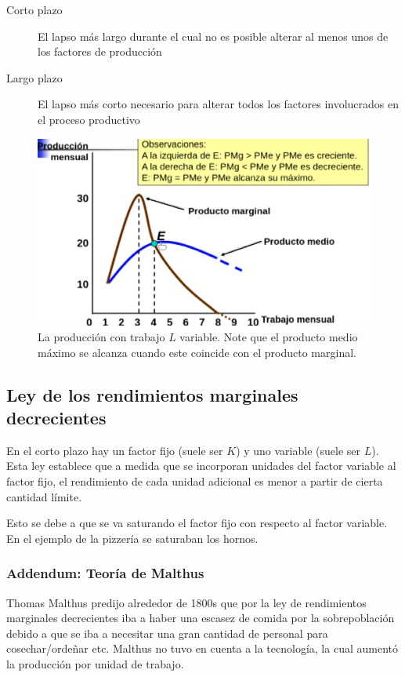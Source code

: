 \documentclass[twocolumn,10pt]{article}
\begin{document}
\begin{description}
	\item[Corto plazo] El lapso más largo durante el cual no es posible alterar al menos unos de los factores de producción
	\item[Largo plazo] El lapso más corto necesario para alterar todos los factores involucrados en el proceso productivo
\end{description}

\begin{figure}[tbh!]
	\centering
	\includegraphics[width=1\linewidth]{fig/funcionProduccionLvar}
	\caption{La producci\'on con trabajo $L$ variable. Note que el producto medio m\'aximo se alcanza cuando este coincide con el producto marginal.}
	\label{fig:funcionproduccionlvar}
\end{figure}



\subsection{Ley de los rendimientos marginales decrecientes}
En el corto plazo hay un factor fijo (suele ser $K$) y uno variable (suele ser $L$). Esta ley establece que a medida que se incorporan unidades del factor variable al factor fijo, el rendimiento de cada unidad adicional es menor a partir de cierta cantidad límite.

Esto se debe a que se va saturando el factor fijo con respecto al factor variable. En el ejemplo de la pizzería se saturaban los hornos.

 \subsubsection{Addendum: Teor\'ia de Malthus}
Thomas Malthus predijo alrededor de 1800s que por la ley de rendimientos marginales decrecientes iba a haber una escasez de comida por la sobrepoblaci\'on debido a que se iba a necesitar una gran cantidad de personal para cosechar/orde\~nar etc. Malthus no tuvo en cuenta a la tecnolog\'ia, la cual aument\'o la producci\'on por unidad de trabajo.
\end{document}
